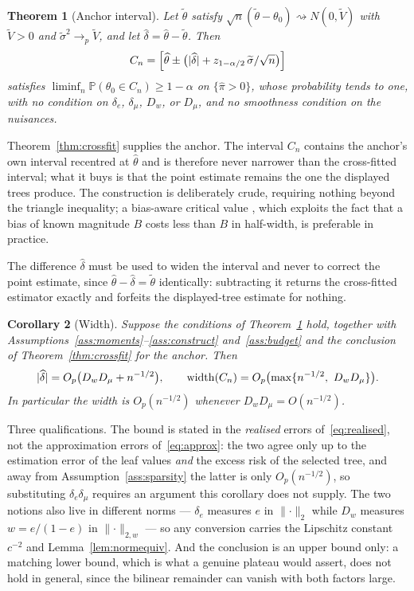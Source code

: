 \documentclass[11pt]{article}
\theoremstyle{plain}
\newtheorem{theorem}{Theorem}[section]
\newtheorem{corollary}[theorem]{Corollary}
\theoremstyle{definition}
\theoremstyle{remark}
\newcommand{\PP}{\mathbb{P}}
\newcommand{\thetahat}{\widehat{\theta}}
\newcommand{\thetatil}{\widetilde{\theta}}
\newcommand{\pihat}{\widehat{\pi}}
\newcommand{\Dw}{D_w}
\newcommand{\Dm}{D_\mu}
\newcommand{\Ltwo}[1]{\lVert #1 \rVert_{2}}
\newcommand{\Lw}[1]{\lVert #1 \rVert_{2,w}}
\DeclarePairedDelimiter{\abs}{\lvert}{\rvert}
\begin{document}
\begin{theorem}[Anchor interval]\label{thm:anchor}
Let $\thetatil$ satisfy
$\sqrt n(\thetatil-\theta_0)\rightsquigarrow N(0,\widetilde V)$ with
$\widetilde V>0$ and $\widetilde\sigma^2\to_p\widetilde V$, and let
$\widehat\delta=\thetahat-\thetatil$. Then
\[
  C_n=\Bigl[\thetahat\pm\bigl(\abs{\widehat\delta}
   +z_{1-\alpha/2}\,\widetilde\sigma/\sqrt n\bigr)\Bigr]
\]
satisfies $\liminf_n\PP(\theta_0\in C_n)\ge1-\alpha$ on $\{\pihat>0\}$, whose
probability tends to one, with no condition on
$\delta_e$, $\delta_\mu$, $\Dw$, or $\Dm$, and no smoothness condition on the
nuisances.
\end{theorem}

\noindent Theorem~\ref{thm:crossfit} supplies the anchor. The interval $C_n$
contains the anchor's own interval recentred at $\thetahat$ and is therefore
never narrower than the cross-fitted interval; what it buys is that the point
estimate remains the one the displayed trees produce. The construction is
deliberately crude, requiring nothing beyond the triangle inequality; a
bias-aware critical value \citep{armstrong2018}, which exploits the fact that a
bias of known magnitude $B$ costs less than $B$ in half-width, is preferable in
practice.

The difference $\widehat\delta$ must be used to widen the interval and never to
correct the point estimate, since $\thetahat-\widehat\delta=\thetatil$
identically: subtracting it returns the cross-fitted estimator exactly and
forfeits the displayed-tree estimate for nothing.

\begin{corollary}[Width]\label{cor:width}
Suppose the conditions of Theorem~\ref{thm:anchor} hold, together with
Assumptions~\ref{ass:moments}--\ref{ass:construct} and~\ref{ass:budget} and the
conclusion of Theorem~\ref{thm:crossfit} for the anchor. Then
\[
  \abs{\widehat\delta}=O_p\bigl(\Dw\Dm+n^{-1/2}\bigr),
  \qquad
  \mathrm{width}(C_n)=O_p\bigl(\max\{n^{-1/2},\ \Dw\Dm\}\bigr).
\]
In particular the width is $O_p(n^{-1/2})$ whenever $\Dw\Dm=O(n^{-1/2})$.
\end{corollary}

\noindent Three qualifications. The bound is stated in the \emph{realised} errors
of~\eqref{eq:realised}, not the approximation errors of~\eqref{eq:approx}: the two
agree only up to the estimation error of the leaf values \emph{and} the excess risk
of the selected tree, and away from Assumption~\ref{ass:sparsity} the latter is
only $O_p(n^{-1/2})$, so substituting $\delta_e\delta_\mu$ requires an argument
this corollary does not supply. The two notions also live in different norms ---
$\delta_e$ measures $e$ in $\Ltwo\cdot$ while $\Dw$ measures $w=e/(1-e)$ in
$\Lw\cdot$ --- so any conversion carries the Lipschitz constant $c^{-2}$ and
Lemma~\ref{lem:normequiv}. And the conclusion is an upper bound only: a matching
lower bound, which is what a genuine plateau would assert, does not hold in
general, since the bilinear remainder can vanish with both factors large.
\end{document}
